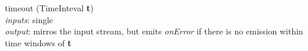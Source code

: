 \documentclass{dithesis}
\begin{document}
\begin{description}
\begin{minipage}[c]{\rrr}

\end{minipage}
\newline \newline \newline
\begin{minipage}[c]{\lll}
\item[timeout] (TimeInteval \textbf{t})\\
	\textit{inputs}: single \\
	\textit{output}: mirros the input stream, but emits \textit{onError} if there is no emission within time windows of \textbf{t}
\end{minipage}
\hfill
\newline \newline \newline
\end{description}
\end{document}
